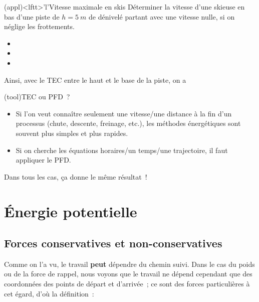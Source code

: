 \documentclass[../../main/main.tex]{subfiles}
\begin{document}
\begin{tcb*}[breakable](appl)<lftt>'l'{Vitesse maximale en skis}
	Déterminer la vitesse d'une skieuse en bas d'une piste de $h = \SI{5}{m}$ de
	dénivelé partant avec une vitesse nulle, si on néglige les frottements.
	\tcblower
	\begin{itemize}
		\item {}
		      \vspace{-15pt}
		\item {}
		\item {}
		      \vspace{-15pt}
	\end{itemize}
	Ainsi, avec le TEC entre le haut et le base de la piste, on a
	\psw{
		\[
			\frac{1}{2}mv^2 = mgh
			\quad\Ra\quad
			\boxed{v = \sqrt{2gh} = \SI{10}{m.s^{-1}}}
		\]
	}
	\vspace*{-20pt}
\end{tcb*}

\begin{tcb*}(tool){TEC ou PFD~?}
	\begin{itemize}
		\item Si l'on veut connaître seulement une vitesse/une distance à la fin
		      d'un processus (chute, descente, freinage, etc.), les méthodes
		      énergétiques sont souvent plus simples et plus rapides.
		\item Si on cherche les équations horaires/un temps/une trajectoire, il
		      faut appliquer le PFD.
	\end{itemize}
	Dans tous les cas, ça donne le même résultat~!
\end{tcb*}

\section{Énergie potentielle}
\subsection{Forces conservatives et non-conservatives}
Comme on l'a vu, le travail \textbf{peut} dépendre du chemin suivi. Dans le cas
du poids ou de la force de rappel, nous voyons que le travail ne dépend
cependant que des coordonnées des points de départ et d'arrivée~; ce sont des
forces particulières à cet égard, d'où la définition~:
\end{document}

